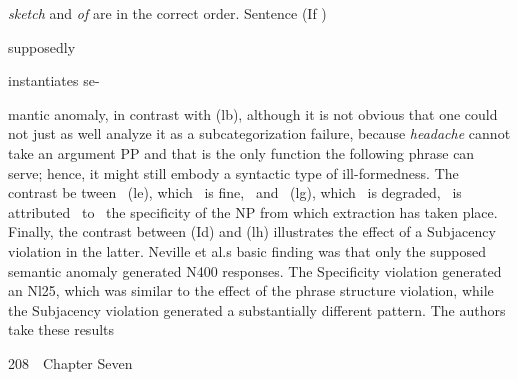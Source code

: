 \begin{multicols}{3}
\begin{styleStandard}
\textit{sketch}\textit{ }and \textit{of}\textit{ }are in the correct order. Sentence (If )
\end{styleStandard}


\begin{styleStandard}
{\textquotesingle}
\end{styleStandard}


\begin{styleStandard}
supposedly
\end{styleStandard}


\begin{styleStandard}
instantiates se-
\end{styleStandard}


\end{multicols}
\begin{styleStandard}
mantic anomaly, in contrast with (lb), although it is not obvious that one could not just as well analyze it as a subcategorization failure, because \textit{headache}\textit{ }cannot take an argument PP and that is the only function the following phrase can serve; hence, it might still embody a syntactic type of ill-formedness. The contrast be\- tween \ (le), which \ is fine, \ and \ (lg), which \ is degraded, \ is attributed \ to \ the specificity of the NP from which extraction has taken place. Finally, the contrast between (Id) and (lh) illustrates the effect of a Subjacency violation in the latter. Neville et al.{\textquotesingle}s basic finding was that only the supposed semantic anomaly generated N400 responses. The Specificity violation generated an Nl25, which was similar to the effect of the phrase structure violation, while the Subjacency violation generated a substantially different pattern. The authors take these results
\end{styleStandard}


\clearpage\setcounter{page}{1}\begin{styleStandard}
208\ \ Chapter Seven
\end{styleStandard}


